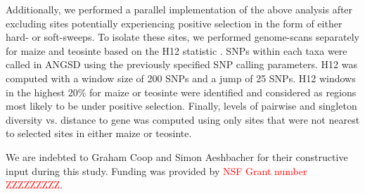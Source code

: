 \documentclass{pnastwo}
\begin{document}
\begin{article}
\begin{materials}
Additionally, we performed a parallel implementation of the above analysis after excluding sites potentially experiencing positive selection in the form of either hard- or soft-sweeps. To isolate these sites, we performed genome-scans separately for maize and teosinte based on the H12 statistic \cite{garud2015}. SNPs within each taxa were called in ANGSD \cite{korneliussen2014} using the previously specified SNP calling parameters. H12 was computed with a window size of 200 SNPs and a jump of 25 SNPs. H12 windows in the highest 20\% for maize or teosinte were identified and considered as regions most likely to be under positive selection. Finally, levels of pairwise and singleton diversity vs. distance to gene was computed using only sites that were not nearest to selected sites in either maize or teosinte.



\end{materials}

\begin{acknowledgments}
We are indebted to Graham Coop and Simon Aeshbacher for their constructive input during this study. Funding was provided by \textcolor{red}{NSF Grant number ZZZZZZZZZ}.
\end{acknowledgments}




\end{article}
\end{document}
